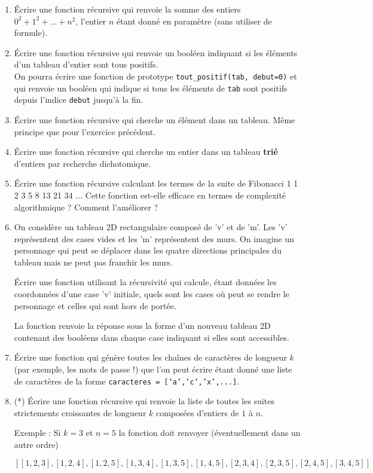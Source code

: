 \documentclass[11pt,a4paper]{article}
\newcommand{\checkbox}{$\square$ \smallskip}
\newcounter{exo} \setcounter{exo}{0}
\newenvironment{action}{%
    \begin{enumerate}[\numerotation] \addtocounter{exo}{-1}%
        }{%
    \end{enumerate}
}
\newcommand{\numexoa}{\theexo \addtocounter{exo}{1}}
\newcommand{\numerotation}{\checkbox \smallskip \numexoa.}
\begin{document}
\begin{action}

  
\item
  \'Ecrire une fonction récursive qui renvoie la somme des entiers $0 ^2 + 1^2 +
  \dots + n^2$, l'entier $n$ étant donné en paramètre (sans utiliser de formule).

\item
\'Ecrire une fonction récursive qui renvoie un booléen indiquant si les éléments
d'un tableau d'entier sont tous positifs.\\
On pourra écrire une fonction de prototype {\tt tout\_positif(tab, debut=0)}
et qui renvoie un booléen qui indique si tous les éléments de {\tt tab}
sont positifs depuis l'indice {\tt debut} jusqu'à la fin.

\item
\'Ecrire une fonction récursive qui cherche un élément dans un tableau. Même
principe que pour l'exercice précédent.\\

\item
\'Ecrire une fonction récursive qui cherche un entier dans un tableau {\bf trié} d'entiers
par recherche dichotomique.\\


\item
\'Ecrire une fonction récursive calculant les termes de la suite de Fibonacci 1 1 2 3 5 8 13 21 34 ... Cette fonction est-elle efficace en termes de complexité algorithmique ? Comment l'améliorer ?

\item On considère un tableau 2D rectangulaire composé de 'v' et de 'm'. Les 'v' représentent des cases
  vides et les 'm' représentent des murs. On imagine un personnage
  qui peut se déplacer dans les quatre directions principales du tableau
  mais ne peut pas franchir les murs.

  \'Ecrire une fonction utilisant la récursivité qui calcule, étant données les
  coordonnées
  d'une case 'v' initiale, quels sont les cases où peut se rendre le personnage
  et celles qui sont hors de portée.

  La fonction renvoie la réponse sous la forme d'un nouveau tableau 2D contenant
  des booléens dans chaque case indiquant si elles sont accessibles.

\item \'Ecrire une fonction qui génère toutes les chaînes de caractères
de longueur $k$ (par exemple, les mots de passe !) que l'on peut
écrire étant donné une liste de
caractères de la forme {\tt caracteres = ['a','c','x',...]}.

\item (*) \'Ecrire une fonction récursive qui renvoie la liste de toutes les suites
  strictements
  croissantes de longueur $k$ composées d'entiers de $1$ à $n$.

  Exemple : Si $k=3$ et $n=5$ la fonction doit renvoyer (éventuellement dans un
  autre ordre)
  
\[ [[1,2,3], [1,2,4], [1,2,5], [1,3,4], [1,3,5], [1,4,5], [2,3,4], [2,3,5],
  [2,4,5], [3,4,5] ] \]

\end{action}
\end{document}
